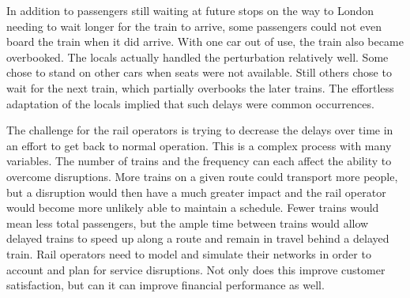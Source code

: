 In addition to passengers still waiting at future stops on the way to London needing to wait longer for the train to arrive, some passengers could not even board the train when it did arrive.  With one car out of use, the train also became overbooked.  The locals actually handled the perturbation relatively well.  Some chose to stand on other cars when seats were not available.  Still others chose to wait for the next train, which partially overbooks the later trains.  The effortless adaptation of the locals implied that such delays were common occurrences.

The challenge for the rail operators is trying to decrease the delays over time in an effort to get back to normal operation.  This is a complex process with many variables.  The number of trains and the frequency can each affect the ability to overcome disruptions.  More trains on a given route could transport more people, but a disruption would then have a much greater impact and the rail operator would become more unlikely able to maintain a schedule.  Fewer trains would mean less total passengers, but the ample time between trains would allow delayed trains to speed up along a route and remain in travel behind a delayed train. Rail operators need to model and simulate their networks in order to account and plan for service disruptions.  Not only does this improve customer satisfaction, but can it can improve financial performance as well.